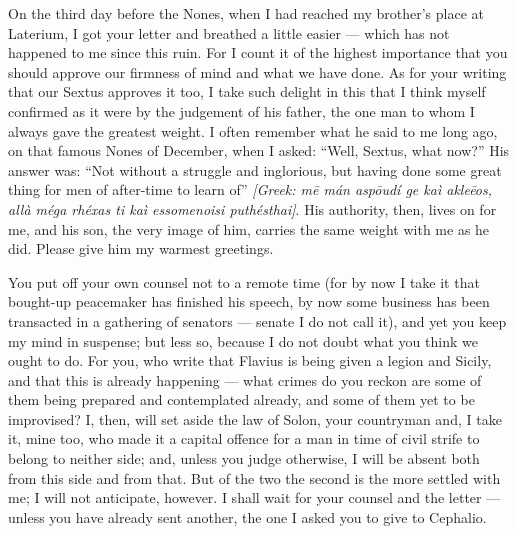 

 On the third day before the Nones, when I had reached my brother's place at Laterium, I got your letter and breathed a little easier --- which has not happened to me since this ruin. For I count it of the highest importance that you should approve our firmness of mind and what we have done. As for your writing that our Sextus approves it too, I take such delight in this that I think myself confirmed as it were by the judgement of his father, the one man to whom I always gave the greatest weight. I often remember what he said to me long ago, on that famous Nones of December, when I asked: ``Well, Sextus, what now?'' His answer was: ``Not without a struggle and inglorious, but having done some great thing for men of after-time to learn of'' \textit{[Greek: m\=e m\'an asp\=oud\'i ge ka\`i akle\=eos, all\`a m\'ega rh\'exas ti ka\`i essomenoisi puth\'esthai]}. His authority, then, lives on for me, and his son, the very image of him, carries the same weight with me as he did. Please give him my warmest greetings.

 You put off your own counsel not to a remote time (for by now I take it that bought-up peacemaker has finished his speech, by now some business has been transacted in a gathering of senators --- senate I do not call it), and yet you keep my mind in suspense; but less so, because I do not doubt what you think we ought to do. For you, who write that Flavius is being given a legion and Sicily, and that this is already happening --- what crimes do you reckon are some of them being prepared and contemplated already, and some of them yet to be improvised? I, then, will set aside the law of Solon, your countryman and, I take it, mine too, who made it a capital offence for a man in time of civil strife to belong to neither side; and, unless you judge otherwise, I will be absent both from this side and from that. But of the two the second is the more settled with me; I will not anticipate, however. I shall wait for your counsel and the letter --- unless you have already sent another, the one I asked you to give to Cephalio.

